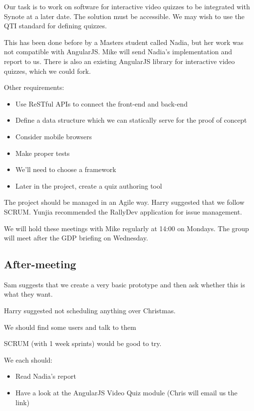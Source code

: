 Our task is to work on software for interactive video quizzes to be
integrated with Synote at a later date. The solution must be accessible.
We may wish to use the QTI standard for defining quizzes.

This has been done before by a Masters student called Nadia, but her
work was not compatible with AngularJS. Mike will send Nadia's
implementation and report to us. There is also an existing AngularJS
library for interactive video quizzes, which we could fork.

Other requirements:

\begin{itemize}
\itemsep1pt\parskip0pt
\item
  Use ReSTful APIs to connect the front-end and back-end
\item
  Define a data structure which we can statically serve for the proof of
  concept
\item
  Consider mobile browsers
\item
  Make proper tests
\item
  We'll need to choose a framework
\item
  Later in the project, create a quiz authoring tool
\end{itemize}

The project should be managed in an Agile way. Harry suggested that we
follow SCRUM. Yunjia recommended the RallyDev application for issue
management.

We will hold these meetings with Mike regularly at 14:00 on Mondays. The
group will meet after the GDP briefing on Wednesday.

\subsection{After-meeting}

Sam suggests that we create a very basic prototype and then ask whether
this is what they want.

Harry suggested not scheduling anything over Christmas.

We should find some users and talk to them

SCRUM (with 1 week sprints) would be good to try.

We each should:

\begin{itemize}
\itemsep1pt\parskip0pt
\item
  Read Nadia's report
\item
  Have a look at the AngularJS Video Quiz module (Chris will email us the link)
\end{itemize}

